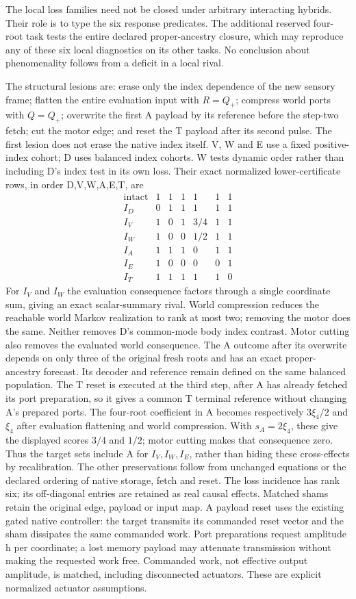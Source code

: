 \documentclass[11pt,a4paper]{article}
\theoremstyle{definition}
\begin{document}
The local loss families need not be closed under arbitrary interacting
hybrids. Their role is to type the six response predicates. The additional
reserved four-root task tests the entire declared proper-ancestry closure,
which may reproduce any of these six local diagnostics on its other tasks.
No conclusion about phenomenality follows from a deficit in a local rival.

The structural lesions are: erase only the index dependence of the new
sensory frame; flatten the entire evaluation input with $R=Q_+$; compress
world ports with $Q=Q_+$; overwrite the first A payload by its reference before the step-two fetch;
cut the motor edge; and reset the T payload after its second pulse.
The first lesion does not erase the native index itself. V, W and E use a
fixed positive-index cohort; D uses balanced index cohorts. W tests dynamic
order rather than including D's index test in its own loss. Their exact
normalized lower-certificate rows, in order D,V,W,A,E,T, are
\[
\begin{array}{c|rrrrrr}
 \mathrm{intact}&1&1&1&1&1&1\\
 I_D&0&1&1&1&1&1\\
 I_V&1&0&1&3/4&1&1\\
 I_W&1&0&0&1/2&1&1\\
 I_A&1&1&1&0&1&1\\
 I_E&1&0&0&0&0&1\\
 I_T&1&1&1&1&1&0
\end{array}
\]
For $I_V$ and $I_W$ the evaluation consequence factors through a single
coordinate sum, giving an exact scalar-summary rival. World compression
reduces the reachable world Markov realization to rank at most two; removing
the motor does the same. Neither removes D's common-mode body index contrast.
Motor cutting also removes the evaluated world consequence. The A outcome after its overwrite depends on only three of the original
fresh roots and has an exact proper-ancestry forecast. Its decoder and
reference remain defined on the same balanced population. The T reset is
executed at the third step, after A has already fetched its port preparation,
so it gives a common T terminal reference without changing A's prepared ports.
The four-root coefficient in A becomes respectively $3\xi_4/2$ and
$\xi_4$ after evaluation flattening and world compression. With
$s_A=2\xi_4$, these give the displayed scores $3/4$ and $1/2$;
motor cutting makes that consequence zero. Thus the target sets include A
for $I_V,I_W,I_E$, rather than hiding these cross-effects by recalibration.
The other preservations follow from unchanged equations or the declared
ordering of native storage, fetch and reset. The loss incidence
has rank six; its off-diagonal entries are retained as real causal effects.
Matched shams retain the original edge, payload or input map. A payload
reset uses the existing gated native controller: the target transmits its
commanded reset vector and the sham dissipates the same commanded work.
Port preparations request amplitude h per coordinate; a lost memory payload
may attenuate transmission without making the requested work free. Commanded
work, not effective output amplitude, is matched, including disconnected
actuators. These are explicit normalized actuator assumptions.
\end{document}
